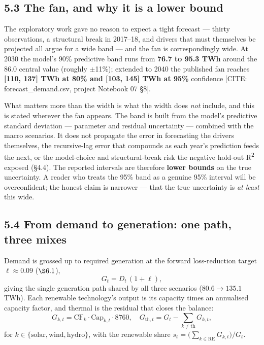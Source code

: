 \documentclass[10pt,twocolumn]{article}
\newcommand{\mk}[1]{{\color{amber}\small #1}}
\begin{document}
\subsection*{5.3 The fan, and why it is a lower bound}

The exploratory work gave no reason to expect a tight forecast --- thirty observations, a structural break in 2017--18, and drivers that must themselves be projected all argue for a wide band --- and the fan is correspondingly wide. At 2030 the model's 90\% predictive band runs from \textbf{76.7 to 95.3 TWh} around the 86.0 central value (roughly $\pm$11\%); extended to 2040 the published fan reaches \textbf{[110, 137] TWh at 80\% and [103, 145] TWh at 95\%} confidence \mk{[CITE: forecast\_demand.csv, project Notebook 07 \S{}8]}.

What matters more than the width is what the width does \textit{not} include, and this is stated wherever the fan appears. The band is built from the model's predictive standard deviation --- parameter and residual uncertainty --- combined with the macro scenarios. It does not propagate the error in forecasting the drivers themselves, the recursive-lag error that compounds as each year's prediction feeds the next, or the model-choice and structural-break risk the negative hold-out R\textsuperscript{2} exposed (\S{}4.4). The reported intervals are therefore \textbf{lower bounds} on the true uncertainty. A reader who treats the 95\% band as a genuine 95\% interval will be overconfident; the honest claim is narrower --- that the true uncertainty is \textit{at least} this wide.

\subsection*{5.4 From demand to generation: one path, three mixes}

\noindent Demand is grossed up to required generation at the forward
loss-reduction target $\ell\approx0.09$ ($\S6.1$),
\begin{equation}
G_t=D_t\,(1+\ell),
\label{eq:gross}
\end{equation}
giving the single generation path shared by all three scenarios
($80.6\rightarrow135.1$ TWh). Each renewable technology's output is its capacity
times an annualised capacity factor, and thermal is the residual that closes the
balance:
\begin{equation}
G_{k,t}=\mathrm{CF}_k\cdot \mathrm{Cap}_{k,t}\cdot 8760,\quad
G_{\mathrm{th},t}=G_t-\!\!\sum_{k\neq\mathrm{th}}\!\! G_{k,t},
\label{eq:mix}
\end{equation}
for $k\in\{\text{solar},\text{wind},\text{hydro}\}$, with the renewable share
$s_t=\bigl(\sum_{k\in\mathrm{RE}}G_{k,t}\bigr)/G_t$.
\end{document}
